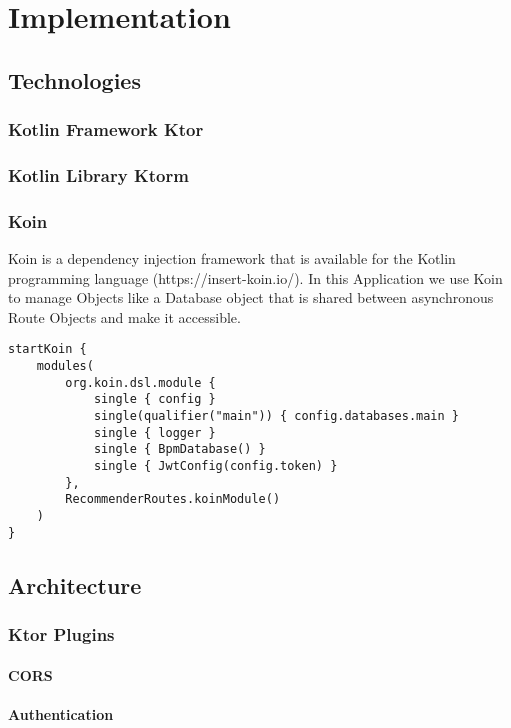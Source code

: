 \chapter{Implementation}

\section{Technologies}
\subsection{Kotlin Framework Ktor}

\subsection{Kotlin Library Ktorm}

\subsection{Koin}

Koin is a dependency injection framework that is available for the Kotlin programming language (https://insert-koin.io/). In this Application we use Koin to manage Objects like a Database object that is shared between asynchronous Route Objects and make it accessible.

\begin{verbatim}
startKoin {
    modules(
        org.koin.dsl.module {
            single { config }
            single(qualifier("main")) { config.databases.main }
            single { logger }
            single { BpmDatabase() }
            single { JwtConfig(config.token) }
        },
        RecommenderRoutes.koinModule()
    )
}
\end{verbatim}
 

\section{Architecture}

\subsection{Ktor Plugins}

\subsubsection{CORS}
\subsubsection{Authentication}
